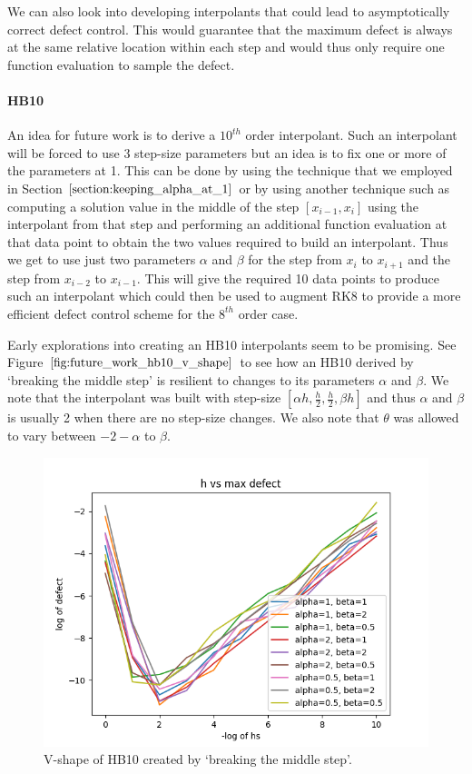 We can also look into developing interpolants that could lead to asymptotically  correct defect control. 
This would guarantee that the maximum defect is always at the same relative location within each step and would thus only require one function evaluation to sample the defect.

\paragraph{HB10}
An idea for future work is to derive a $10^{th}$ order interpolant. Such an interpolant will be forced to use 3 step-size parameters but an idea is to fix one or more of the parameters at 1. This can be done by using the technique that we employed in Section $\ref{section:keeping_alpha_at_1}$ or by using another technique such as computing a solution value in the middle of the step $[x_{i-1}, x_i]$ using the interpolant from that step and performing an additional function evaluation at that data point to obtain the two values required to build an interpolant. Thus we get to use just two parameters $\alpha$ and $\beta$ for the step from $x_i$ to $x_{i+1}$ and the step from $x_{i-2}$ to $x_{i-1}$.  This will give the required 10 data points to produce such an interpolant which could then be used to augment RK8 to provide a more efficient defect control scheme for the $8^{th}$ order case. 

Early explorations into creating an HB10 interpolants seem to be promising. See Figure $\ref{fig:future_work_hb10_v_shape}$ to see how an HB10 derived by `breaking the middle step' is resilient to changes to its parameters $\alpha$ and $\beta$. We note that the interpolant was built with step-size $[\alpha h, \frac{h}{2}, \frac{h}{2}, \beta h]$ and thus $\alpha$ and $\beta$ is usually 2 when there are no step-size changes. We also note that $\theta$ was allowed to vary between $-2-\alpha$ to $\beta$.

\begin{figure}[H]
\centering
\includegraphics[width=0.7\linewidth]{./figures/future_work_hb10_v_shape}
\caption{V-shape of HB10 created by `breaking the middle step'.}
\label{fig:future_work_hb10_v_shape}
\end{figure}
